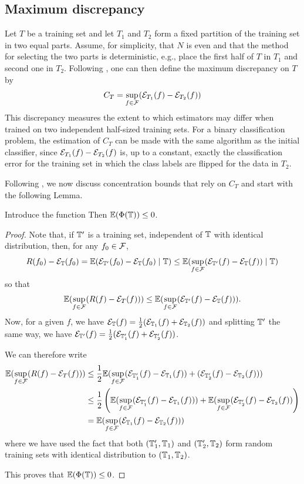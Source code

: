\subsection{Maximum discrepancy}
\label{sec:max.disc}
Let $T$ be a training set and let  $T_1$ and $T_2$ form a fixed partition of the training set in two
equal parts. Assume, for simplicity, that $N$ is even and that the method for selecting the two parts is deterministic, e.g., place the first half of $T$ in $T_1$ and second one in $T_2$. Following \citet{bbl02}, 
one can then define the maximum
discrepancy on $T$ by
$$
C_{T} = \sup_{f\in{\mathcal F}} ({\mathcal E}_{T_1}(f) - {\mathcal E}_{T_2}(f))
$$
 This discrepancy measures the extent to which estimators may differ when trained on
two independent half-sized training sets. 
For a binary classification problem, the estimation of $C_{T}$ can
be made with the same algorithm as the initial classifier, since
${\mathcal E}_{T_1}(f) - {\mathcal E}_{T_2}(f)$ is, up to a constant, exactly the classification error for
the training set in which the class labels are flipped for the data in
$T_2$.

Following \citep{bbl02}, we now discuss concentration bounds that rely on  $C_{T}$ and start with the following Lemma.
\begin{lemma}
\label{lem:max.disc}
Introduce the function
Then $\bm{\mathbb E}(\Phi({\mathbb T})) \leq 0$. 
\end{lemma}
 \begin{proof}
Note that, if ${\mathbb T}'$ is a training set, independent of ${\mathbb T}$ with identical distribution, then, for any $f_0\in {\mathcal F}$, 
\[ 
R(f_0) - {\mathcal E}_{\mathbb T}(f_0) = \bm{\mathbb E}({\mathcal E}_{{\mathbb T}'}(f_0) - {\mathcal E}_{{\mathbb T}}(f_0)\mid{\mathbb T})  \leq \bm{\mathbb E}(\sup_{f\in{\mathcal F}}( {\mathcal E}_{{\mathbb T}'}(f) - {\mathcal E}_{{\mathbb T}}(f))\mid {\mathbb T})
\]
so that 
\[
\bm{\mathbb E}(\sup_{f\in{\mathcal F}} (R(f) - {\mathcal E}_T(f))) \leq \bm{\mathbb E}(\sup_{f\in{\mathcal F}} ({\mathcal E}_{{\mathbb T}'}(f) - {\mathcal E}_{{\mathbb T}}(f))).
\]
Now, for a given $f$, we have ${\mathcal E}_{{\mathbb T}}(f) = \frac12 ({\mathcal E}_{{\mathbb T}_1}(f) + {\mathcal E}_{{\mathbb T}_2}(f))$ and splitting ${\mathbb T}'$ the same way, we have ${\mathcal E}_{{\mathbb T}'}(f) = \frac12 ({\mathcal E}_{{\mathbb T}'_1}(f) + {\mathcal E}_{{\mathbb T}'_2}(f))$.

We can therefore  write
\begin{align*}
\bm{\mathbb E}(\sup_{f\in{\mathcal F}} (R(f) - {\mathcal E}_T(f))) & \leq \frac12 \bm{\mathbb E}(\sup_{f\in{\mathcal F}} ({\mathcal E}_{{\mathbb T}'_1}(f) - {\mathcal E}_{{\mathbb T}_1}(f)) + ({\mathcal E}_{{\mathbb T}'_2}(f) - {\mathcal E}_{{\mathbb T}_2}(f)))\\
& \leq \frac12 \left(\bm{\mathbb E}(\sup_{f\in{\mathcal F}} ({\mathcal E}_{{\mathbb T}'_1}(f) - {\mathcal E}_{{\mathbb T}_1}(f))) + \bm{\mathbb E}(\sup_{f\in{\mathcal F}} ({\mathcal E}_{{\mathbb T}'_2}(f) - {\mathcal E}_{{\mathbb T}_2}(f))\right)\\
&= \bm{\mathbb E}(\sup_{f\in{\mathcal F}} ({\mathcal E}_{{\mathbb T}_1}(f) - {\mathcal E}_{{\mathbb T}_2}(f)))
\end{align*}
where we have used the fact that both $({\mathbb T}'_1, {\mathbb T}_1)$ and $({\mathbb T}'_2, {\mathbb T}_2)$ form random training sets with identical distribution to $({\mathbb T}_1, {\mathbb T}_2)$.

This proves that $\bm{\mathbb E}(\Phi({\mathbb T})) \leq 0$.
\end{proof}


